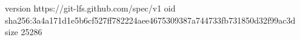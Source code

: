 version https://git-lfs.github.com/spec/v1
oid sha256:3a4a171d1e5b6cf527ff782224aee4675309387a744733fb731850d32f99ac3d
size 25286
